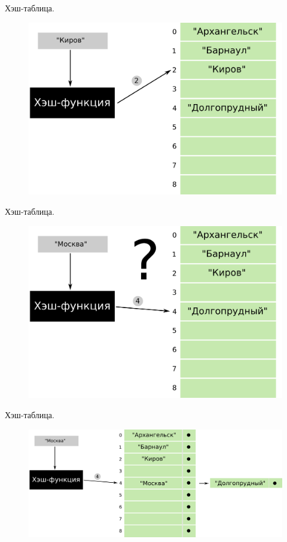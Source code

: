 \documentclass[10pt]{beamer}
\begin{document}
\begin{frame}{Хэш-таблица.}
\begin{figure}
\centerline{\includegraphics[width=0.86\linewidth]{images/hash_6.png}}
\end{figure}
\end{frame}

\begin{frame}{Хэш-таблица.}
\begin{figure}
\centerline{\includegraphics[width=0.9\linewidth]{images/hash_7.png}}
\end{figure}
\end{frame}

\begin{frame}{Хэш-таблица.}
\begin{figure}
\centerline{\includegraphics[width=0.99\linewidth]{images/hash_8.png}}
\end{figure}
\end{frame}
\end{document}
